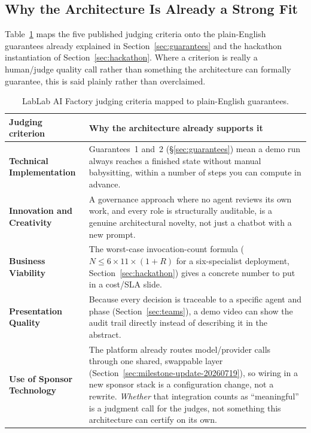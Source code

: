 \documentclass[12pt]{article}
\begin{document}
\subsection{Why the Architecture Is Already a Strong Fit}

Table~\ref{tab:lablab-factory-fit} maps the five published judging
criteria onto the plain-English guarantees already explained in
Section~\ref{sec:guarantees} and the hackathon instantiation of
Section~\ref{sec:hackathon}.  Where a criterion is really a
human/judge quality call rather than something the architecture can
formally guarantee, this is said plainly rather than overclaimed.

\begin{table}[H]
\centering
\caption{LabLab AI Factory judging criteria mapped to plain-English guarantees.}
\label{tab:lablab-factory-fit}
\begin{tabularx}{\linewidth}{@{}>{\bfseries\RaggedRight}p{3.2cm} >{\RaggedRight\arraybackslash}X@{}}
\toprule
\textbf{Judging criterion} & \textbf{Why the architecture already supports it} \\
\midrule
Technical Implementation &
  Guarantees~1 and~2 (\S\ref{sec:guarantees}) mean a demo run always
  reaches a finished state without manual babysitting, within a
  number of steps you can compute in advance. \\[4pt]
Innovation and Creativity &
  A governance approach where no agent reviews its own work, and
  every role is structurally auditable, is a genuine architectural
  novelty, not just a chatbot with a new prompt. \\[4pt]
Business Viability &
  The worst-case invocation-count formula ($N \leq 6 \times 11 \times
  (1+R)$ for a six-specialist deployment, Section~\ref{sec:hackathon})
  gives a concrete number to put in a cost/SLA slide. \\[4pt]
Presentation Quality &
  Because every decision is traceable to a specific agent and phase
  (Section~\ref{sec:teams}), a demo video can show the audit trail
  directly instead of describing it in the abstract. \\[4pt]
Use of Sponsor Technology &
  The platform already routes model/provider calls through one
  shared, swappable layer (Section~\ref{sec:milestone-update-20260719}),
  so wiring in a new sponsor stack is a configuration change, not a
  rewrite.  \emph{Whether} that integration counts as ``meaningful''
  is a judgment call for the judges, not something this architecture
  can certify on its own. \\
\bottomrule
\end{tabularx}
\end{table}
\end{document}
